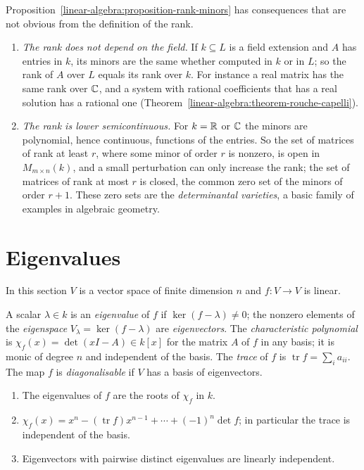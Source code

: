\begin{remark}\label{linear-algebra:remark-rank-minors}
Proposition~\ref{linear-algebra:proposition-rank-minors} has consequences that are not obvious from the definition of the rank.
\begin{enumerate}
\item \emph{The rank does not depend on the field.} If $k \subseteq L$ is a field extension and $A$ has entries in $k$, its minors are the same whether computed in $k$ or in $L$; so the rank of $A$ over $L$
equals its rank over $k$. For instance a real matrix has the same rank over $\mathbb{C}$, and a system with rational coefficients that has a real solution has a rational one (Theorem~\ref{linear-algebra:theorem-rouche-capelli}).
\item \emph{The rank is lower semicontinuous.} For $k = \mathbb{R}$ or $\mathbb{C}$ the minors are polynomial, hence continuous, functions of the entries. So the set of matrices of rank at least $r$, where some minor
of order $r$ is nonzero, is open in $M_{m \times n}(k)$, and a small perturbation can only increase the rank; the set of matrices of rank at most $r$ is closed, the common zero set of the minors of
order $r + 1$. These zero sets are the \emph{determinantal varieties}, a basic family of examples in algebraic geometry.
\end{enumerate}
\end{remark}

\section{Eigenvalues}\label{linear-algebra:section-eigenvalues}

In this section $V$ is a vector space of finite dimension $n$ and $f \colon V \to V$ is linear.

\begin{definition}\label{linear-algebra:definition-eigen}
A scalar $\lambda \in k$ is an \emph{eigenvalue} of $f$ if $\ker(f - \lambda) \neq 0$; the nonzero elements of
the \emph{eigenspace} $V_\lambda = \ker(f - \lambda)$ are \emph{eigenvectors}. The \emph{characteristic
polynomial} is $\chi_f(x) = \det(xI - A) \in k[x]$ for the matrix $A$ of $f$ in any basis; it is monic of
degree $n$ and independent of the basis. The \emph{trace} of $f$ is $\operatorname{tr} f = \sum_i a_{ii}$. The map
$f$ is \emph{diagonalisable} if $V$ has a basis of eigenvectors.
\end{definition}

\begin{proposition}\label{linear-algebra:proposition-eigen-basics}
\begin{enumerate}
\item The eigenvalues of $f$ are the roots of $\chi_f$ in $k$.
\item $\chi_f(x) = x^n - (\operatorname{tr} f)x^{n-1} + \cdots + (-1)^n\det f$; in particular the trace is
independent of the basis.
\item Eigenvectors with pairwise distinct eigenvalues are linearly independent.
\end{enumerate}
\end{proposition}

